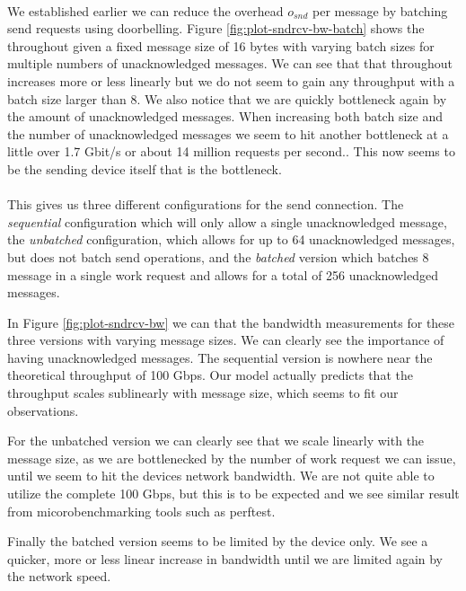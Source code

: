 \paragraph{} We established earlier we can reduce the overhead $o_{snd}$ per message by batching send requests using
doorbelling. Figure \ref{fig:plot-sndrcv-bw-batch} shows the throughout given a fixed message size of 16 bytes with 
varying batch sizes for multiple numbers of unacknowledged messages. We can see that that throughout increases more or
less linearly but we do not seem to gain any throughput with a batch size larger than 8. We also notice that we are
quickly bottleneck again by the amount of unacknowledged messages. When increasing both batch size and the number of
unacknowledged messages we seem to hit another bottleneck at a little over 1.7 Gbit/s or about 14 million requests 
per second.. This now seems to be the sending device itself that 
is the bottleneck.



\paragraph{} This gives us three different configurations for the send connection. The \emph{sequential} configuration
which will only allow a single unacknowledged message, the \emph{unbatched} configuration, which allows for up to 64
unacknowledged messages, but does not batch send operations, and the \emph{batched} version which batches 8 message
in a single work request and allows for a total of 256 unacknowledged messages.

In Figure \ref{fig:plot-sndrcv-bw} we can that the bandwidth measurements for these three versions with varying message
sizes. We can clearly see the importance of having unacknowledged messages. The sequential version is nowhere near the
theoretical throughput of 100 Gbps. Our model actually predicts that the throughput scales sublinearly with message size,
which seems to fit our observations.

For the unbatched version we can clearly see that we scale linearly with the message size, as we are bottlenecked by 
the number of work request we can issue, until we seem to hit the devices network bandwidth. We are not quite able to
utilize the complete 100 Gbps, but this is to be expected and we see similar result from micorobenchmarking tools such
as perftest.

Finally the batched version seems to be limited by the device only. We see a quicker, more or less linear increase in 
bandwidth until we are limited again by the network speed.


